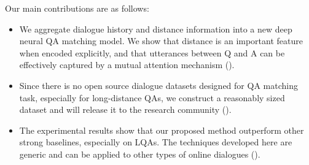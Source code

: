 Our main contributions are as follows:
\begin{itemize}
    \item We aggregate dialogue history and distance information into a new deep
neural QA matching model. We show that distance is an important feature when encoded explicitly, and that utterances between Q and A can be effectively captured by a mutual attention mechanism ().  %
    \item Since there is no open source dialogue datasets designed for
QA matching task, especially for long-distance QAs, 
we construct a reasonably sized dataset and will release it to the research community (). 
    \item The experimental results show that our proposed method outperform 
other strong baselines, especially on LQAs. 
The techniques developed here are generic and can
be applied to other types of online dialogues ().
\end{itemize}

